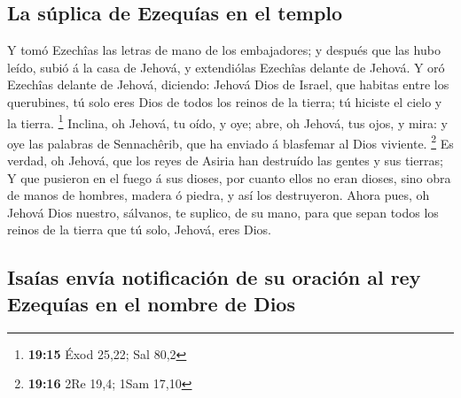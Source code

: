 \hypertarget{la-suxfaplica-de-ezequuxedas-en-el-templo}{%
\subsection{La súplica de Ezequías en el
templo}\label{la-suxfaplica-de-ezequuxedas-en-el-templo}}

 Y tomó Ezechîas las letras de mano de los embajadores; y
después que las hubo leído, subió á la casa de Jehová, y extendiólas
Ezechîas delante de Jehová.  Y oró Ezechîas delante de
Jehová, diciendo: Jehová Dios de Israel, que habitas entre los
querubines, tú solo eres Dios de todos los reinos de la tierra; tú
hiciste el cielo y la tierra. \footnote{\textbf{19:15} Éxod 25,22; Sal
  80,2}  Inclina, oh Jehová, tu oído, y oye; abre, oh
Jehová, tus ojos, y mira: y oye las palabras de Sennachêrib, que ha
enviado á blasfemar al Dios viviente. \footnote{\textbf{19:16} 2Re 19,4;
  1Sam 17,10}  Es verdad, oh Jehová, que los reyes de
Asiria han destruído las gentes y sus tierras;  Y que
pusieron en el fuego á sus dioses, por cuanto ellos no eran dioses, sino
obra de manos de hombres, madera ó piedra, y así los destruyeron.
 Ahora pues, oh Jehová Dios nuestro, sálvanos, te suplico,
de su mano, para que sepan todos los reinos de la tierra que tú solo,
Jehová, eres Dios.

\hypertarget{isauxedas-envuxeda-notificaciuxf3n-de-su-oraciuxf3n-al-rey-ezequuxedas-en-el-nombre-de-dios}{%
\subsection{Isaías envía notificación de su oración al rey Ezequías en
el nombre de
Dios}\label{isauxedas-envuxeda-notificaciuxf3n-de-su-oraciuxf3n-al-rey-ezequuxedas-en-el-nombre-de-dios}}

